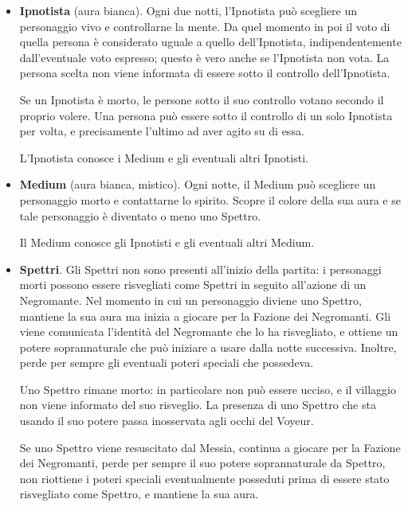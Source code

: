 \documentclass[a4paper,10pt]{article}
\begin{document}
\begin{itemize}
 \item {\bf Ipnotista} (aura bianca). Ogni due notti, l'Ipnotista può scegliere un personaggio vivo e controllarne la mente.
 Da quel momento in poi il voto di quella persona è considerato uguale a quello dell'Ipnotista, indipendentemente dall'eventuale voto espresso; questo è vero anche se l'Ipnotista non vota.
 La persona scelta non viene informata di essere sotto il controllo dell'Ipnotista.

 Se un Ipnotista è morto, le persone sotto il suo controllo votano secondo il proprio volere.
 Una persona può essere sotto il controllo di un solo Ipnotista per volta, e precisamente l'ultimo ad aver agito su di essa.

 L'Ipnotista conosce i Medium e gli eventuali altri Ipnotisti.

 \item {\bf Medium} (aura bianca, mistico). Ogni notte, il Medium può scegliere un personaggio morto e contattarne lo spirito. Scopre il colore della sua aura e se tale personaggio è diventato o meno uno Spettro.

 Il Medium conosce gli Ipnotisti e gli eventuali altri Medium.

 \item {\bf Spettri}. Gli Spettri non sono presenti all'inizio della partita: i personaggi morti possono essere risvegliati come Spettri in seguito all'azione di un Negromante.
 Nel momento in cui un personaggio diviene uno Spettro, mantiene la sua aura ma inizia a giocare per la Fazione dei Negromanti. Gli viene comunicata l'identità del Negromante che lo ha risvegliato, e ottiene un potere soprannaturale che può iniziare a usare dalla notte successiva. Inoltre, perde per sempre gli eventuali poteri speciali che possedeva.
 
 Uno Spettro rimane morto: in particolare non può essere ucciso, e il villaggio non viene informato del suo risveglio.
 La presenza di uno Spettro che sta usando il suo potere passa inosservata agli occhi del Voyeur.
 
 Se uno Spettro viene resuscitato dal Messia, continua a giocare per la Fazione dei Negromanti, perde per sempre il suo potere soprannaturale da Spettro, non riottiene i poteri speciali eventualmente posseduti prima di essere stato risvegliato come Spettro, e mantiene la sua aura.
 
\end{itemize}
\end{document}

